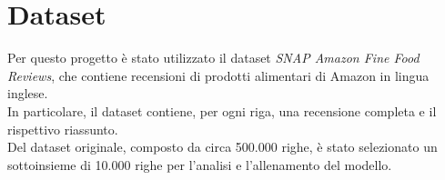 \section{Dataset}
Per questo progetto è stato utilizzato il dataset \textit{SNAP Amazon Fine Food Reviews}\cite{datasetkaggle}\cite{datasetpaper}, che contiene recensioni di prodotti alimentari di Amazon in lingua inglese.\\
In particolare, il dataset contiene, per ogni riga, una recensione completa e il rispettivo riassunto.\\
Del dataset originale, composto da circa 500.000 righe, è stato selezionato un sottoinsieme di 10.000 righe per l'analisi e l'allenamento del modello.


